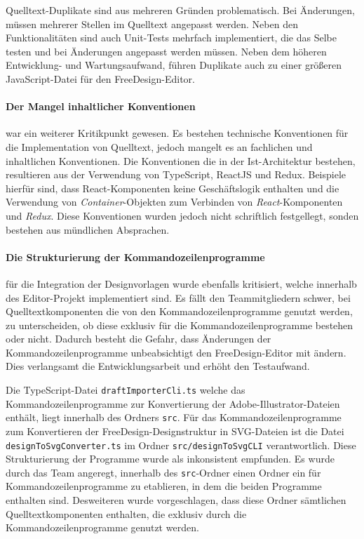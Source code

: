 Quelltext-Duplikate sind aus mehreren Gründen problematisch. Bei Änderungen, müssen mehrerer Stellen im Quelltext angepasst werden. Neben den Funktionalitäten sind auch Unit-Tests mehrfach implementiert, die das Selbe testen und bei Änderungen angepasst werden müssen. Neben dem höheren Entwicklung- und Wartungsaufwand, führen Duplikate auch zu einer größeren JavaScript-Datei für den FreeDesign-Editor. 

\paragraph{Der Mangel inhaltlicher Konventionen} war ein weiterer Kritikpunkt gewesen. Es bestehen technische Konventionen für die Implementation von Quelltext, jedoch mangelt es an fachlichen und inhaltlichen Konventionen. Die Konventionen die in der Ist-Architektur bestehen, resultieren aus der Verwendung von TypeScript, ReactJS und Redux. Beispiele hierfür sind, dass React-Komponenten keine Geschäftslogik enthalten und die Verwendung von \emph{Container}-Objekten zum Verbinden von \emph{React}-Komponenten und \emph{Redux}.
Diese Konventionen wurden jedoch nicht schriftlich festgellegt, sonden bestehen aus mündlichen Absprachen. 

\paragraph{Die Strukturierung der Kommandozeilenprogramme} für die Integration der Designvorlagen wurde ebenfalls kritisiert, welche innerhalb des Editor-Projekt implementiert sind.
Es fällt den Teammitgliedern  schwer, bei Quelltextkomponenten die von den Kommandozeilenprogramme genutzt werden, zu unterscheiden, ob diese exklusiv für die Kommandozeilenprogramme bestehen oder nicht. Dadurch besteht die Gefahr, dass Änderungen der Kommandozeilenprogramme unbeabsichtigt den FreeDesign-Editor mit ändern. Dies verlangsamt die Entwicklungsarbeit und erhöht den Testaufwand.

Die TypeScript-Datei \lstinline|draftImporterCli.ts| welche das Kommandozeilenprogramme zur Konvertierung der Adobe-Illustrator-Dateien enthält, liegt innerhalb des Ordners \lstinline|src|. Für das Kommandozeilenprogramme zum Konvertieren der FreeDesign-Designstruktur in SVG-Dateien ist die Datei \lstinline|designToSvgConverter.ts| im Ordner \lstinline|src/designToSvgCLI| verantwortlich. Diese Strukturierung der Programme wurde als inkonsistent empfunden. 
Es wurde durch das Team angeregt, innerhalb des \lstinline|src|-Ordner einen Ordner ein für Kommandozeilenprogramme zu etablieren, in dem die beiden Programme enthalten sind. Desweiteren wurde vorgeschlagen, dass diese Ordner sämtlichen Quelltextkomponenten enthalten, die exklusiv durch die Kommandozeilenprogramme genutzt werden.  

